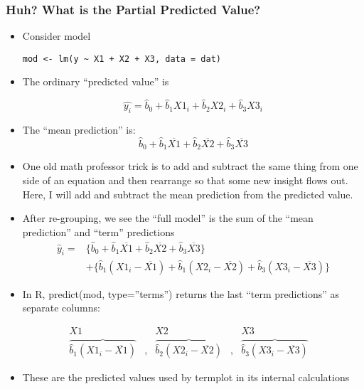 \documentclass[10pt,english]{beamer}
\begin{document}
\begin{frame}
\frametitle{Huh? What is the Partial Predicted Value?}
\begin{itemize}
\item Consider model \textrm{}
\begin{lstlisting}
mod <- lm(y ~ X1 + X2 + X3, data = dat)
\end{lstlisting}
\item The ordinary ``predicted value'' is 


\[
\hat{y_{i}}=\hat{b}_{0}+\hat{b}_{1}X1_{i}+\hat{b}_{2}X2_{i}+\hat{b}_{3}X3_{i}
\]


\item The ``mean prediction'' is: 
\[
\hat{b}_{0}+\hat{b}_{1}\overline{X1}+\hat{b}_{2}\overline{X2}+\hat{b}_{3}\overline{X3}
\]

\item One old math professor trick is to add and subtract the same thing
from one side of an equation and then rearrange so that some new insight
flows out. Here, I will add and subtract the mean prediction from
the predicted value.
\item After re-grouping, we see the ``full model'' is the sum of the ``mean
prediction'' and ``term'' predictions
\begin{eqnarray}
\hat{y}_{i}= & \{\hat{b}_{0}+\hat{b}_{1}\overline{X1}+\hat{b}_{2}\overline{X2}+\hat{b}_{3}\overline{X3}\}\nonumber \\
 & +\{\hat{b}_{1}(X1_{i}-\overline{X1})+\hat{b}_{1}(X2_{i}-\overline{X2})+\hat{b}_{3}(X3_{i}-\overline{X3})\}
\end{eqnarray}

\item In R, predict(mod, type=''terms'') returns the last ``term predictions''
as separate columns:
\end{itemize}
\begin{equation}
\begin{array}{cccccc}
 & X1 &  & X2 &  & X3\\
 & \overbrace{\hat{b}_{1}(X1_{i}-\overline{X1})} & , & \overbrace{\hat{b}_{2}(X2_{i}-\overline{X2})} & , & \overbrace{\hat{b}_{3}(X3_{i}-\overline{X3})}
\end{array}
\end{equation}

\begin{itemize}
\item These are the predicted values used by termplot in its internal calculations
\end{itemize}
\end{frame}
\end{document}
